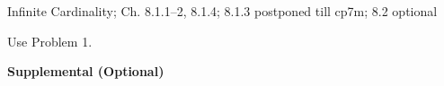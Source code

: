 \documentclass[handout]{mcs}
\begin{document}


\begin{staffnotes}
Infinite Cardinality;  Ch. 8.1.1--2, 8.1.4; 8.1.3 postponed till cp7m; 8.2 optional
\end{staffnotes}


\hint Use Problem 1.




\begin{center}
\textbf{Supplemental (Optional)}
\end{center}




\end{document}
